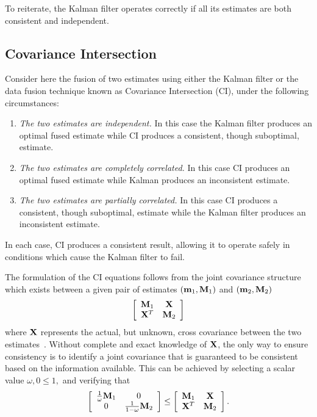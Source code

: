 To reiterate, the Kalman filter operates correctly if all its estimates are both consistent and independent.


\subsection{Covariance Intersection}

Consider here the fusion of two estimates using either the Kalman filter or the data fusion technique known as
Covariance Intersection (CI), under the following circumstances:~\cite{uhlmann03}
\begin{enumerate}
\item {\em The two estimates are independent.} In this case the Kalman filter produces an optimal fused estimate while
CI produces a consistent, though suboptimal, estimate.
\item {\em The two estimates are completely correlated.} In this case CI produces an optimal fused estimate while
Kalman produces an inconsistent estimate.
\item {\em The two estimates are partially correlated.} In this case CI produces a consistent, though suboptimal,
estimate while the Kalman filter produces an inconsistent estimate.  \end{enumerate}
In each case, CI produces a consistent result, allowing it to operate safely in conditions which cause the Kalman filter
to fail.

The formulation of the CI equations follows from the joint covariance structure which exists between a given pair of
estimates $(\mathbf{m}_1,\mathbf{M}_1)$ and $(\mathbf{m}_2,\mathbf{M}_2)$
\begin{equation}\label{eqn:jointcov}
\left[\begin{array}{cc}
    \mathbf{M}_1 & \mathbf{X} \\
    \mathbf{X}^T & \mathbf{M}_2
\end{array}\right]
\end{equation}
where $\mathbf{X}$ represents the actual, but unknown, cross covariance between the two estimates~\cite{uhlmann03}. Without
complete and exact knowledge of $\mathbf{X}$, the only way to ensure consistency is to identify a joint covariance that is
guaranteed to be consistent based on the information available. This can be achieved by selecting a scalar value
$\omega, 0\leq1,$ and verifying that
\begin{equation}\label{eqn:cijointcov}
\left[\begin{array}{cc}
    \frac{1}{\omega}\mathbf{M}_1 & 0 \\
    0                       & \frac{1}{1-\omega}\mathbf{M}_2
\end{array}\right]
\leq
\left[\begin{array}{cc}
    \mathbf{M}_1 & \mathbf{X} \\
    \mathbf{X}^T & \mathbf{M}_2
\end{array}\right].
\end{equation}


